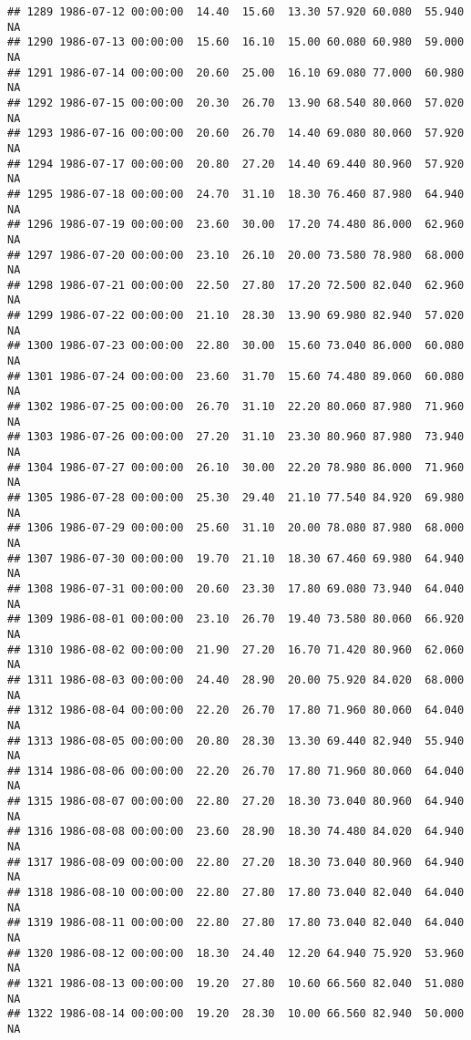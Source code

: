 \documentclass{article}\usepackage{graphicx, color}
\makeatletter
\newenvironment{kframe}{%
 \def\at@end@of@kframe{}%
 \ifinner\ifhmode%
  \def\at@end@of@kframe{\end{minipage}}%
  \begin{minipage}{\columnwidth}%
 \fi\fi%
 \def\FrameCommand##1{\hskip\@totalleftmargin \hskip-\fboxsep
 \colorbox{shadecolor}{##1}\hskip-\fboxsep
     \hskip-\linewidth \hskip-\@totalleftmargin \hskip\columnwidth}%
 \MakeFramed {\advance\hsize-\width
   \@totalleftmargin\z@ \linewidth\hsize
   \@setminipage}}%
 {\par\unskip\endMakeFramed%
 \at@end@of@kframe}
\newenvironment{knitrout}{}{} %
\makeatother
\begin{document}
\begin{knitrout}
\begin{kframe}
\begin{verbatim}
## 1289 1986-07-12 00:00:00  14.40  15.60  13.30 57.920 60.080  55.940     NA
## 1290 1986-07-13 00:00:00  15.60  16.10  15.00 60.080 60.980  59.000     NA
## 1291 1986-07-14 00:00:00  20.60  25.00  16.10 69.080 77.000  60.980     NA
## 1292 1986-07-15 00:00:00  20.30  26.70  13.90 68.540 80.060  57.020     NA
## 1293 1986-07-16 00:00:00  20.60  26.70  14.40 69.080 80.060  57.920     NA
## 1294 1986-07-17 00:00:00  20.80  27.20  14.40 69.440 80.960  57.920     NA
## 1295 1986-07-18 00:00:00  24.70  31.10  18.30 76.460 87.980  64.940     NA
## 1296 1986-07-19 00:00:00  23.60  30.00  17.20 74.480 86.000  62.960     NA
## 1297 1986-07-20 00:00:00  23.10  26.10  20.00 73.580 78.980  68.000     NA
## 1298 1986-07-21 00:00:00  22.50  27.80  17.20 72.500 82.040  62.960     NA
## 1299 1986-07-22 00:00:00  21.10  28.30  13.90 69.980 82.940  57.020     NA
## 1300 1986-07-23 00:00:00  22.80  30.00  15.60 73.040 86.000  60.080     NA
## 1301 1986-07-24 00:00:00  23.60  31.70  15.60 74.480 89.060  60.080     NA
## 1302 1986-07-25 00:00:00  26.70  31.10  22.20 80.060 87.980  71.960     NA
## 1303 1986-07-26 00:00:00  27.20  31.10  23.30 80.960 87.980  73.940     NA
## 1304 1986-07-27 00:00:00  26.10  30.00  22.20 78.980 86.000  71.960     NA
## 1305 1986-07-28 00:00:00  25.30  29.40  21.10 77.540 84.920  69.980     NA
## 1306 1986-07-29 00:00:00  25.60  31.10  20.00 78.080 87.980  68.000     NA
## 1307 1986-07-30 00:00:00  19.70  21.10  18.30 67.460 69.980  64.940     NA
## 1308 1986-07-31 00:00:00  20.60  23.30  17.80 69.080 73.940  64.040     NA
## 1309 1986-08-01 00:00:00  23.10  26.70  19.40 73.580 80.060  66.920     NA
## 1310 1986-08-02 00:00:00  21.90  27.20  16.70 71.420 80.960  62.060     NA
## 1311 1986-08-03 00:00:00  24.40  28.90  20.00 75.920 84.020  68.000     NA
## 1312 1986-08-04 00:00:00  22.20  26.70  17.80 71.960 80.060  64.040     NA
## 1313 1986-08-05 00:00:00  20.80  28.30  13.30 69.440 82.940  55.940     NA
## 1314 1986-08-06 00:00:00  22.20  26.70  17.80 71.960 80.060  64.040     NA
## 1315 1986-08-07 00:00:00  22.80  27.20  18.30 73.040 80.960  64.940     NA
## 1316 1986-08-08 00:00:00  23.60  28.90  18.30 74.480 84.020  64.940     NA
## 1317 1986-08-09 00:00:00  22.80  27.20  18.30 73.040 80.960  64.940     NA
## 1318 1986-08-10 00:00:00  22.80  27.80  17.80 73.040 82.040  64.040     NA
## 1319 1986-08-11 00:00:00  22.80  27.80  17.80 73.040 82.040  64.040     NA
## 1320 1986-08-12 00:00:00  18.30  24.40  12.20 64.940 75.920  53.960     NA
## 1321 1986-08-13 00:00:00  19.20  27.80  10.60 66.560 82.040  51.080     NA
## 1322 1986-08-14 00:00:00  19.20  28.30  10.00 66.560 82.940  50.000     NA

\end{verbatim}
\end{kframe}
\end{knitrout}
\end{document}
